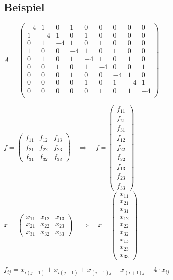 \subsection{Beispiel}
\begin{frame}

\tiny\centering
	$	A = \left(
	\begin{array}{ccc|ccc|ccc}
		-4 & 1 & 0  &  1 & 0 & 0 & 0 & 0 & 0 \\
		 1 &-4 & 1  &  0 & 1 & 0 & 0 & 0 & 0 \\
		 0 & 1 & -4 &  1 & 0 & 1 & 0 & 0 & 0 \\\hline
		 1 & 0 & 0  & -4 & 1 & 0 & 1 & 0 & 0 \\
		 0 & 1 & 0  & 1 & -4 & 1 & 0 & 1 & 0 \\
		 0 & 0 & 1  & 0 & 1 & -4 & 0 & 0 & 1 \\\hline
		 0 & 0 & 0  & 1 & 0 & 0 & -4 & 1 & 0 \\
		 0 & 0 & 0  & 0 & 1 & 0 & 1 & -4 & 1 \\
		 0 & 0 & 0  & 0 & 0 & 1 & 0 & 1 & -4 \\
	\end{array}
	\right)
	$
	
	\vspace{3em}
	
	$f = \left(
	\begin{array}{ccc}
		f_{11} & f_{12} & f_{13} \\
		f_{21} & f_{22} & f_{23} \\
		f_{31} & f_{32} & f_{33} 
	\end{array}
	\right) \quad\Rightarrow\quad
	f = \left(
	\begin{array}{c}
		f_{11} \\
		f_{21}\\
		f_{31}\\
		f_{12}\\
		f_{22}\\
		f_{32}\\
		f_{13}\\
		f_{23}\\
		f_{33}
	\end{array}
	\right)$
	\hspace{3em}
	$x = \left(
	\begin{array}{ccc}
		x_{11} & x_{12} & x_{13} \\
		x_{21} & x_{22} & x_{23} \\
		x_{31} & x_{32} & x_{33} 
	\end{array}
	\right) \quad\Rightarrow\quad
	x = \left(
	\begin{array}{c}
		x_{11} \\
		x_{21}\\
		x_{31}\\
		x_{12}\\
		x_{22}\\
		x_{32}\\
		x_{13}\\
		x_{23}\\
		x_{33}
	\end{array}
	\right)$
	
	\scriptsize
	\vspace{3em}
	$f_{ij}= x_{i(j-1)} + x_{i(j+1)} + x_{(i-1)j} + x_{(i+1)j}- 4\cdot x_{ij}$
\end{frame}